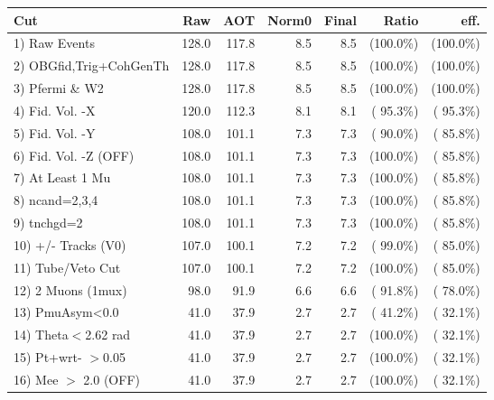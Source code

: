  \begin{table}[h!]\centering
 \begin{tabular}{||l||r|r|r|r|r|r||}
 \hline
 \hline
 Cut & Raw & AOT & Norm0 & Final & Ratio & eff.       \\
 \hline
  1) Raw Events           &        128.0 &        117.8 &          8.5 &          8.5 & (100.0\%) & (100.0\%) \\
  2) OBGfid,Trig+CohGenTh &        128.0 &        117.8 &          8.5 &          8.5 & (100.0\%) & (100.0\%) \\
  3) Pfermi \& W2         &        128.0 &        117.8 &          8.5 &          8.5 & (100.0\%) & (100.0\%) \\
  4) Fid. Vol. -X         &        120.0 &        112.3 &          8.1 &          8.1 & ( 95.3\%) & ( 95.3\%) \\
  5) Fid. Vol. -Y         &        108.0 &        101.1 &          7.3 &          7.3 & ( 90.0\%) & ( 85.8\%) \\
  6) Fid. Vol. -Z (OFF)   &        108.0 &        101.1 &          7.3 &          7.3 & (100.0\%) & ( 85.8\%) \\
  7) At Least 1 Mu        &        108.0 &        101.1 &          7.3 &          7.3 & (100.0\%) & ( 85.8\%) \\
  8) ncand=2,3,4          &        108.0 &        101.1 &          7.3 &          7.3 & (100.0\%) & ( 85.8\%) \\
  9) tnchgd=2             &        108.0 &        101.1 &          7.3 &          7.3 & (100.0\%) & ( 85.8\%) \\
 10) +/- Tracks (V0)      &        107.0 &        100.1 &          7.2 &          7.2 & ( 99.0\%) & ( 85.0\%) \\
 11) Tube/Veto Cut        &        107.0 &        100.1 &          7.2 &          7.2 & (100.0\%) & ( 85.0\%) \\
 12) 2 Muons (1mux)       &         98.0 &         91.9 &          6.6 &          6.6 & ( 91.8\%) & ( 78.0\%) \\
 13) PmuAsym<0.0          &         41.0 &         37.9 &          2.7 &          2.7 & ( 41.2\%) & ( 32.1\%) \\
 14) Theta$<$2.62 rad     &         41.0 &         37.9 &          2.7 &          2.7 & (100.0\%) & ( 32.1\%) \\
 15) Pt+wrt- $>$0.05      &         41.0 &         37.9 &          2.7 &          2.7 & (100.0\%) & ( 32.1\%) \\
 16) Mee $>$ 2.0  (OFF)   &         41.0 &         37.9 &          2.7 &          2.7 & (100.0\%) & ( 32.1\%) \\

\end{tabular}
\end{table}
